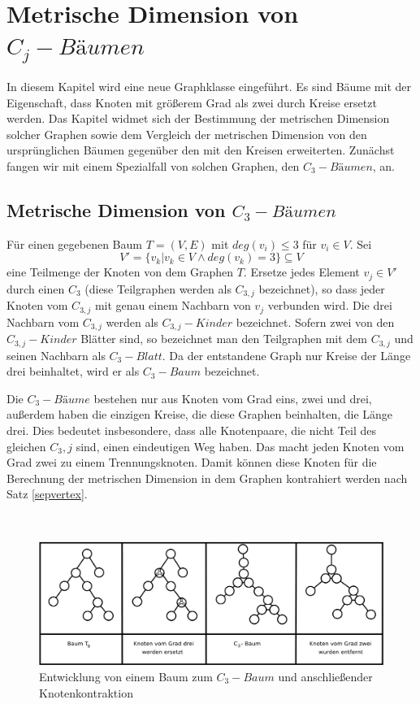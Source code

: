 \section{Metrische Dimension von $C_j-Bäumen$}
In diesem Kapitel wird eine neue Graphklasse eingeführt. Es sind Bäume mit der Eigenschaft, dass Knoten mit größerem Grad als zwei durch Kreise ersetzt werden. Das Kapitel widmet sich der Bestimmung der metrischen Dimension solcher Graphen sowie dem Vergleich der metrischen Dimension von den ursprünglichen Bäumen gegenüber den mit den Kreisen erweiterten. Zunächst fangen wir mit einem Spezialfall von solchen Graphen, den $C_3-Bäumen$, an.
\subsection{Metrische Dimension von $C_3-Bäumen$}
\begin{defi}
\label{C_{3} tree}
Für einen gegebenen Baum $T=(V,E)$ mit $deg(v_i)\leq 3$ für $v_i \in V$. Sei $$V'=\{v_k|v_k \in V \wedge deg(v_k)=3\}\subseteq V$$ eine Teilmenge der Knoten von dem Graphen $T$. Ersetze jedes Element $v_j \in V'$ durch einen $C_3$ (diese Teilgraphen werden als \emph{$C_{3,j}$} bezeichnet), so dass jeder Knoten vom $C_{3,j}$ mit genau einem Nachbarn von $v_j$ verbunden wird. Die drei Nachbarn vom $C_{3,j}$ werden als \emph{$C_{3,j}-Kinder$} bezeichnet. Sofern zwei von den $C_{3,j}-Kinder$ Blätter sind, so bezeichnet man den Teilgraphen mit dem $C_{3,j}$ und seinen Nachbarn als \emph{$C_{3}-Blatt$}. Da der entstandene Graph nur Kreise der Länge drei beinhaltet, wird er als \emph{$C_3-Baum$} bezeichnet. 
   \end{defi}
Die $C_3-Bäume$ bestehen nur aus Knoten vom Grad eins, zwei und drei, außerdem haben die einzigen Kreise, die diese Graphen beinhalten, die Länge drei. Dies bedeutet insbesondere, dass alle Knotenpaare, die nicht Teil des gleichen $C_3,j$ sind, einen eindeutigen Weg haben. Das macht jeden Knoten vom Grad zwei zu einem Trennungsknoten. Damit können diese Knoten für die Berechnung der metrischen Dimension in dem Graphen kontrahiert werden nach Satz \ref{sepvertex}.
\begin{bsp} \textcolor{white}{lala} \vspace{-6mm}
\begin{figure}[h!]
		\centering 		 
   \includegraphics[width=420pt]{bilder/trees.pdf}
	\caption{Entwicklung von einem Baum zum $C_{3}-Baum$ und anschließender Knotenkontraktion}
  	 \end{figure}
\end{bsp}
